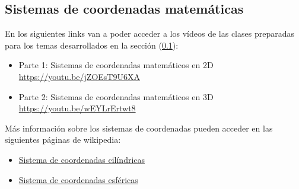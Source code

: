 \subsection{Sistemas de coordenadas matemáticas}
\label{c.scm}

En los siguientes links van a poder acceder a los vídeos de las clases
preparadas para los temas desarrollados en la sección (\ref{c.scm}):

\begin{itemize}
  \item Parte 1: Sistemas de coordenadas matemáticos en 2D\\
    \href{https://youtu.be/jZOEsT9U6XA}{https://youtu.be/jZOEsT9U6XA}
  \item Parte 2: Sistemas de coordenadas matemáticos en 3D\\
    \href{https://youtu.be/wEYLrErtwt8}{https://youtu.be/wEYLrErtwt8} \\
\end{itemize}

Más información sobre los sistemas de coordenadas pueden acceder en las
siguientes páginas de wikipedia:
\begin{itemize}
  \item 
    \href{https://es.wikipedia.org/wiki/Coordenadas\_cil\%C3\%ADndricas}
    {Sistema de coordenadas cilíndricas}
  \item  
    \href{https://es.wikipedia.org/wiki/Coordenadas\_esf\%C3\%A9ricas}
    {Sistema de coordenadas esféricas}
\end{itemize}


